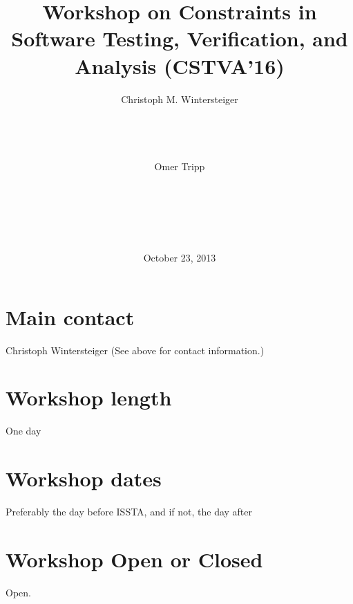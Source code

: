 \documentclass{sig-alternate}
\begin{document}
\title{Workshop on Constraints in Software Testing, Verification, and
  Analysis (CSTVA'16)}


\author{
  Christoph M. Wintersteiger\\
  \\
  \\
  \\
  \\  
  \alignauthor
  Omer Tripp\\
  \\
  \\
  \\
  \\
  \\
}
\date{October 23, 2013}

\maketitle
\toappear{}

\section{Main contact}
\vspace{0.2cm}
Christoph Wintersteiger (See above for contact information.)

\section{Workshop length}
\vspace{0.2cm}
One day

\section{Workshop dates}
\vspace{0.2cm}
Preferably the day before ISSTA, and if not, the day after

\section{Workshop Open or Closed}
\vspace{0.2cm}
Open.
\end{document}
